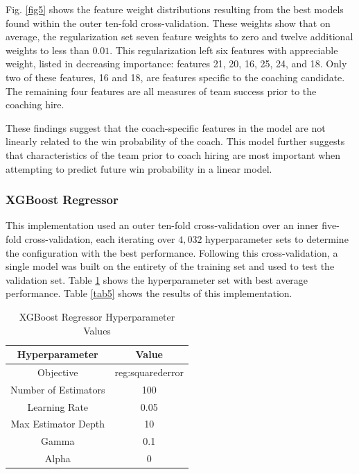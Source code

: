 \documentclass[conference]{IEEEtran}
\begin{document}
Fig. \ref{fig5} shows the feature weight distributions resulting from the best models found within the outer ten-fold cross-validation. These weights show that on average, the regularization set seven feature weights to zero and twelve additional weights to less than $0.01$. This regularization left six features with appreciable weight, listed in decreasing importance: features 21, 20, 16, 25, 24, and 18. Only two of these features, 16 and 18, are features specific to the coaching candidate. The remaining four features are all measures of team success prior to the coaching hire. 

These findings suggest that the coach-specific features in the model are not linearly related to the win probability of the coach. This model further suggests that characteristics of the team prior to coach hiring are most important when attempting to predict future win probability in a linear model.

\subsubsection{XGBoost Regressor}
This implementation used an outer ten-fold cross-validation over an inner five-fold cross-validation, each iterating over $4,032$ hyperparameter sets to determine the configuration with the best performance. Following this cross-validation, a single model was built on the entirety of the training set and used to test the validation set. Table \ref{tab4} shows the hyperparameter set with best average performance. Table \ref{tab5} shows the results of this implementation.

\begin{table}[htbp]
\caption{XGBoost Regressor Hyperparameter Values}
\begin{center}
\begin{tabular}{|c||c|}
\hline
\textbf{Hyperparameter} & \textbf{Value} \\
\hline
\hline
Objective & reg:squarederror \\
\hline
Number of Estimators & 100 \\
\hline
Learning Rate & 0.05 \\
\hline
Max Estimator Depth & 10 \\
\hline
Gamma & 0.1 \\
\hline
Alpha & 0 \\
\hline
\end{tabular}
\label{tab4}
\end{center}
\end{table}
\end{document}
